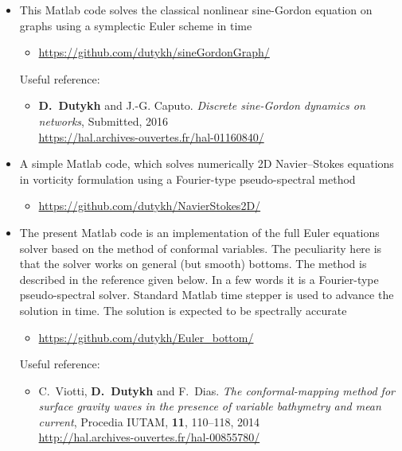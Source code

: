 \documentclass[final, a4paper, oneside, 12pt]{article}
\numberwithin{equation}{section}
\begin{document}
\begin{itemize}
  
  \item This Matlab code solves the classical nonlinear sine-Gordon equation on graphs using a symplectic Euler scheme in time
  
  \begin{itemize}
    \item \url{https://github.com/dutykh/sineGordonGraph/}
  \end{itemize}
  
  Useful reference:
  \begin{itemize}
    \item \textbf{D.~Dutykh} and J.-G. Caputo. \textit{Discrete sine-Gordon dynamics on networks}, Submitted, 2016 \\
  \url{https://hal.archives-ouvertes.fr/hal-01160840/}
  \end{itemize}
  
\end{itemize}

\begin{itemize}
  
  \item A simple Matlab code, which solves numerically 2D Navier--Stokes equations in vorticity formulation using a Fourier-type pseudo-spectral method
  
  \begin{itemize}
    \item \url{https://github.com/dutykh/NavierStokes2D/}
  \end{itemize}
  
\end{itemize}

\begin{itemize}

  \item The present Matlab code is an implementation of the full Euler equations solver based on the method of conformal variables. The peculiarity here is that the solver works on general (but smooth) bottoms. The method is described in the reference given below. In a few words it is a Fourier-type pseudo-spectral solver. Standard Matlab time stepper is used to advance the solution in time. The solution is expected to be spectrally accurate
  
  \begin{itemize}
    \item \url{https://github.com/dutykh/Euler_bottom/}
  \end{itemize}
  
  Useful reference:
  \begin{itemize}
    \item C.~Viotti, \textbf{D.~Dutykh} and F.~Dias. \textit{The conformal-mapping method for surface gravity waves in the presence of variable bathymetry and mean current}, Procedia IUTAM, \textbf{11}, 110--118, 2014 \\
    \url{http://hal.archives-ouvertes.fr/hal-00855780/}
  \end{itemize}

\end{itemize}
\end{document}
